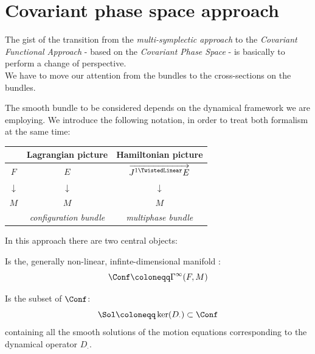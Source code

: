 \documentclass[a4paper,12pt]{scrartcl}  %
\renewcommand{\LinDualJet}{ \overrightarrow{J^{1 \TwistedLinear}E} }
\begin{document}
\section{Covariant phase space approach}
The gist of the transition from the \emph{multi-symplectic approach} to the \emph{Covariant Functional Approach} - based on the \emph{Covariant Phase Space} - is basically to perform a change of perspective.\\
We have to move our attention from the bundles to the cross-sections on the bundles.

The smooth bundle to be considered depends on the dynamical framework we are employing.
We introduce the following notation, in order to treat both formalism at the same time:
\begin{notation}
	\begin{center}
		\begin{tabular}{|c|c|c|}
			\hline
			 & Lagrangian picture & Hamiltonian picture \\
			\hline
			$F$		&	$E$		&	$\LinDualJet$	\\
			$\downarrow$ & $\downarrow$ & $\downarrow$ \\
			$M$ & $M$ & $M$ \\
			    & \emph{configuration bundle} & \emph{multiphase bundle} \\
			\hline
		\end{tabular}
	\end{center}
\end{notation}


In this approach there are two central objects:

	\begin{definition}\label{Def:ConfSpace}
		Is the, generally non-linear, infinte-dimensional manifold :
		\begin{displaymath}
			\Conf \coloneqq \Gamma^\infty(F,M)
		\end{displaymath}
	\end{definition}
	
	\begin{definition}\label{Def:SolSpace}
		Is the subset of $\Conf$:
		\begin{displaymath}
			\Sol \coloneqq \ker(D_\cdot) \subset \Conf
		\end{displaymath}
		containing all the smooth solutions of the motion equations corresponding to the  dynamical operator $D_\cdot$.
	\end{definition}
\end{document}
